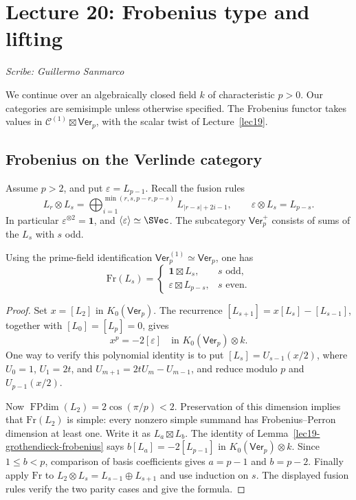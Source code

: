 \section{Lecture 20: Frobenius type and lifting}
\label{lec20}
\noindent\textit{Scribe: Guillermo Sanmarco}

We continue over an algebraically closed field $k$ of characteristic $p>0$.
Our categories are semisimple unless otherwise specified. The Frobenius
functor takes values in $\mathcal C^{(1)}\boxtimes\mathsf{Ver}_p$, with the
scalar twist of Lecture~\ref{lec19}.

\subsection{Frobenius on the Verlinde category}
Assume $p>2$, and put $\varepsilon=L_{p-1}$. Recall the fusion rules
\[
 L_r\otimes L_s=
 \bigoplus_{i=1}^{\min(r,s,p-r,p-s)}L_{|r-s|+2i-1},
 \qquad \varepsilon\otimes L_s=L_{p-s}.
\]
In particular $\varepsilon^{\otimes2}=\mathbf1$, and
$\langle\varepsilon\rangle\simeq\SVec$. The subcategory
$\mathsf{Ver}_p^+$ consists of sums of the $L_s$ with $s$ odd.

\begin{proposition}\label{lec20-verlinde-frobenius}
Using the prime-field identification
$\mathsf{Ver}_p^{(1)}\simeq\mathsf{Ver}_p$, one has
\[
 \mathrm{Fr}(L_s)=
 \begin{cases}
  \mathbf1\boxtimes L_s,&s\text{ odd},\\
  \varepsilon\boxtimes L_{p-s},&s\text{ even}.
 \end{cases}
\]
\end{proposition}
\begin{proof}
Set $x=[L_2]$ in $K_0(\mathsf{Ver}_p)$. The recurrence
$[L_{s+1}]=x[L_s]-[L_{s-1}]$, together with $[L_0]=[L_p]=0$, gives
\[
 x^p=-2[\varepsilon]
 \quad\text{in }K_0(\mathsf{Ver}_p)\otimes k.
\]
One way to verify this polynomial identity is to put
$[L_s]=U_{s-1}(x/2)$, where
$U_0=1$, $U_1=2t$, and $U_{m+1}=2tU_m-U_{m-1}$, and reduce modulo
$p$ and $U_{p-1}(x/2)$.

Now $\operatorname{FPdim}(L_2)=2\cos(\pi/p)<2$. Preservation of this
dimension implies that $\mathrm{Fr}(L_2)$ is simple: every nonzero simple
summand has Frobenius--Perron dimension at least one. Write it as
$L_a\boxtimes L_b$. The identity of
Lemma~\ref{lec19-grothendieck-frobenius} says
$b[L_a]=-2[L_{p-1}]$ in $K_0(\mathsf{Ver}_p)\otimes k$.
Since $1\leq b<p$, comparison of basis coefficients gives
$a=p-1$ and $b=p-2$.
Finally apply $\mathrm{Fr}$ to
$L_2\otimes L_s=L_{s-1}\oplus L_{s+1}$ and use induction on $s$.
The displayed fusion rules verify the two parity cases and give the formula.
\end{proof}

